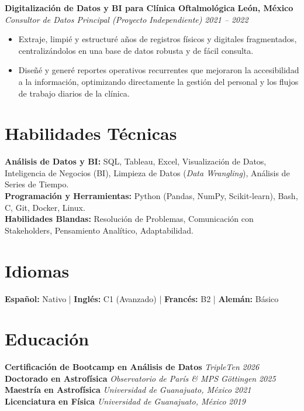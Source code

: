 \documentclass[10pt,a4paper]{article}
\begin{document}
\textbf{Digitalización de Datos y BI para Clínica Oftalmológica} \hfill \textbf{León, México} \\
\textit{Consultor de Datos Principal (Proyecto Independiente)} \hfill \textit{2021 -- 2022}
\begin{itemize}[leftmargin=1.5em]
    \item Extraje, limpié y estructuré años de registros físicos y digitales fragmentados, centralizándolos en una base de datos robusta y de fácil consulta.
    \item Diseñé y generé reportes operativos recurrentes que mejoraron la accesibilidad a la información, optimizando directamente la gestión del personal y los flujos de trabajo diarios de la clínica.
\end{itemize}

\section*{Habilidades Técnicas}
\textbf{Análisis de Datos y BI:} SQL, Tableau, Excel, Visualización de Datos, Inteligencia de Negocios (BI), Limpieza de Datos (\textit{Data Wrangling}), Análisis de Series de Tiempo. \\
\textbf{Programación y Herramientas:} Python (Pandas, NumPy, Scikit-learn), Bash, C, Git, Docker, Linux. \\
\textbf{Habilidades Blandas:} Resolución de Problemas, Comunicación con Stakeholders, Pensamiento Analítico, Adaptabilidad.

\section*{Idiomas}
\textbf{Español:} Nativo \quad | \quad \textbf{Inglés:} C1 (Avanzado) \quad | \quad \textbf{Francés:} B2 \quad | \quad \textbf{Alemán:} Básico

\section*{Educación}
\textbf{Certificación de Bootcamp en Análisis de Datos} \hfill \textit{TripleTen} \hfill \textit{2026}\\
\textbf{Doctorado en Astrofísica} \hfill \textit{Observatorio de París \& MPS Göttingen} \hfill \textit{2025}\\
\textbf{Maestría en Astrofísica} \hfill \textit{Universidad de Guanajuato, México} \hfill \textit{2021}\\
\textbf{Licenciatura en Física} \hfill \textit{Universidad de Guanajuato, México} \hfill \textit{2019}
\end{document}
